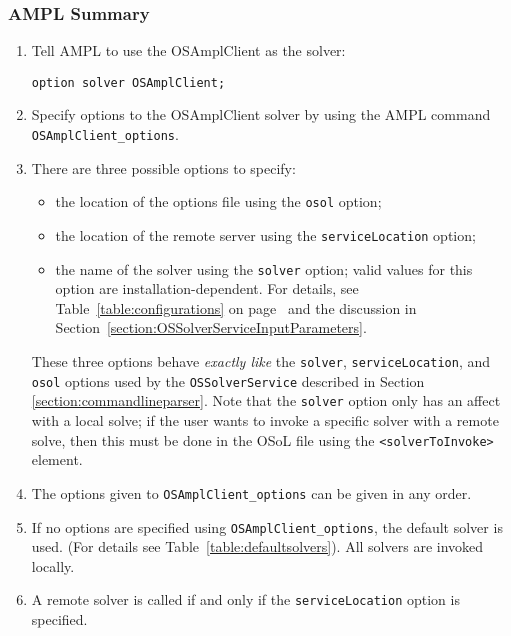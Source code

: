 \subsubsection{AMPL Summary}

\begin{enumerate}
\item Tell  AMPL to use the OSAmplClient as the solver:

\begin{verbatim}
option solver OSAmplClient;
\end{verbatim}

\item Specify options to the OSAmplClient solver by using the AMPL command {\tt OSAmplClient\_options}.

\item There are three possible options to specify:

\begin{itemize}
\item the location of the options file using  the {\tt osol} option;

\item the location of the remote server using   the {\tt serviceLocation} option;

\item the name of the solver using the  {\tt solver} option; valid values for this option  are 
installation-dependent. 
For details, see Table~\ref{table:configurations} on page~\pageref{table:configurations} 
and the discussion in Section~\ref{section:OSSolverServiceInputParameters}. 

\end{itemize}

These three options behave {\it exactly like} the {\tt solver}, {\tt serviceLocation}, and {\tt osol} options used by the {\tt OSSolverService} described in  Section \ref{section:commandlineparser}.
Note that the {\tt solver} option only has an affect with a local solve; 
if the user wants to invoke a specific solver with a remote solve, then this must be done in the OSoL file using the {\tt <solverToInvoke>} element.

\item  The options given to {\tt OSAmplClient\_options}  can be given in any order.

\item If no options are specified using {\tt OSAmplClient\_options},  the default solver is used.
(For details see Table~\ref{table:defaultsolvers}).
All solvers are invoked locally. 


\item A remote solver is called if and only if the {\tt serviceLocation} option is specified.

\end{enumerate}

